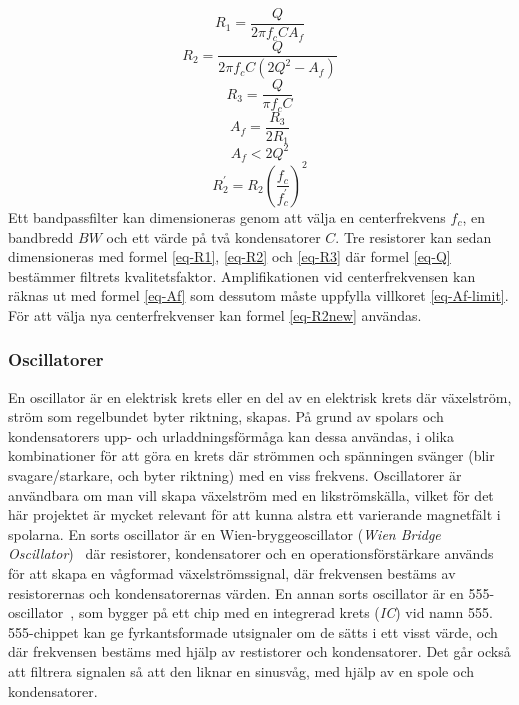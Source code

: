 \documentclass[a4paper]{article}
\makeatletter
\let\\\@raggedtwoe@savedcr%
\makeatother
\begin{document}
\begin{sloppypar}
    \begin{equation}
        \label{eq-R1}
        R_{1} =  \frac{Q}{2 \pi f_{c} C A_{f}}
    \end{equation}
    \begin{equation}
        \label{eq-R2}
        R_{2} =  \frac{Q}{2 \pi f_{c} C (2 Q^{2}- A_{f})}
    \end{equation}
    \begin{equation}
        \label{eq-R3}
        R_{3} =  \frac{Q}{\pi f_{c} C }
    \end{equation}
    \begin{equation}
        \label{eq-Af}
        A_{f} =  \frac{R_{3}}{2R_{1}}
    \end{equation}
    \begin{equation}
        \label{eq-Af-limit}
        A_{f} < 2 Q^{2}
    \end{equation}
    \begin{equation}
        \label{eq-R2new}
        R_{2}^{'} = R_{2} (\frac{f_{c}}{f_{c}^{'}})^{2}
    \end{equation}
    \noindent
    Ett bandpassfilter kan dimensioneras genom att välja en centerfrekvens $f_{c}$, en bandbredd $BW$ och ett värde på två kondensatorer $C$.
    Tre resistorer kan sedan dimensioneras med formel \ref{eq-R1}, \ref{eq-R2} och \ref{eq-R3} där formel \ref{eq-Q} bestämmer filtrets kvalitetsfaktor.
    Amplifikationen vid centerfrekvensen kan räknas ut med formel \ref{eq-Af} som dessutom måste uppfylla villkoret \ref{eq-Af-limit}.
    För att välja nya centerfrekvenser kan formel \ref{eq-R2new} användas.~\cite{Band-Pass-Filter}

    \subsubsection{Oscillatorer}
    En oscillator är en elektrisk krets eller en del av en elektrisk krets där växelström, ström som regelbundet byter riktning, skapas.
    På grund av spolars och kondensatorers upp- och urladdningsförmåga kan dessa användas, i olika kombinationer för att göra en krets där strömmen och spänningen svänger (blir svagare/starkare, och byter riktning) med en viss frekvens.
    Oscillatorer är användbara om man vill skapa växelström med en likströmskälla, vilket för det här projektet är mycket relevant för att kunna alstra ett varierande magnetfält i spolarna.
    \\\\
    En sorts oscillator är en Wien-bryggeoscillator (\textit{Wien Bridge Oscillator})~\cite{WienBridge} där resistorer, kondensatorer och en operationsförstärkare används för att skapa en vågformad växelströmssignal, där frekvensen bestäms av resistorernas och kondensatorernas värden.
    En annan sorts oscillator är en 555-oscillator~\cite{555_sine}, som bygger på ett chip med en integrerad krets (\textit{IC}) vid namn 555. 555-chippet kan ge fyrkantsformade utsignaler om de sätts i ett visst värde, och där frekvensen bestäms med hjälp av restistorer och kondensatorer. Det går också att filtrera signalen så att den liknar en sinusvåg, med hjälp av en spole och kondensatorer.


\end{sloppypar}
\end{document}
